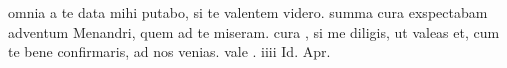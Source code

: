 


omnia a te data mihi putabo, si te valentem videro. summa cura exspectabam adventum Menandri, quem ad te miseram. cura , si me diligis, ut valeas et, cum te bene confirmaris, ad nos venias. vale . iiii Id. Apr.
